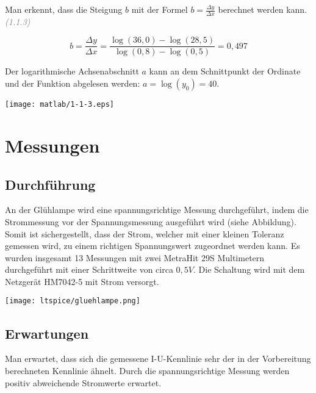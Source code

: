 Man erkennt, dass die Steigung $b$ mit der Formel $b = \frac{\varDelta y}{\varDelta x}  $ berechnet werden kann. \textcolor{gray}{\textit{(1.1.3)}}

\begin{equation*}
b = \frac{\varDelta y}{\varDelta x} = \frac{\log(36,0)-\log(28,5)}{\log(0,8)-\log(0,5)} = 0,497
\end{equation*}

Der logarithmische Achsenabschnitt $a$ kann an dem Schnittpunkt der Ordinate und der Funktion abgelesen werden:  $a = \log(y_0) = 40$.



\begin{center}
	\texttt{[image: matlab/1-1-3.eps]}
\end{center}
	
\section{Messungen}




	\subsection{Durchführung}
	
	An der Glühlampe wird eine spannungsrichtige Messung durchgeführt, indem die Strommessung vor der Spannungsmessung ausgeführt wird (siehe Abbildung). Somit ist sichergestellt, dass der Strom, welcher mit einer kleinen Toleranz gemessen wird, zu einem richtigen Spannungswert zugeordnet werden kann. Es wurden insgesamt 13 Messungen mit zwei MetraHit 29S Multimetern durchgeführt mit einer Schrittweite von circa $0,5V$. Die Schaltung wird mit dem Netzgerät HM7042-5 mit Strom versorgt.
	
	\newpage
	\thispagestyle{fancy}
	
	\begin{center}
		\texttt{[image: ltspice/gluehlampe.png]}
	\end{center}
	
	\subsection{Erwartungen}
	
	Man erwartet, dass sich die gemessene I-U-Kennlinie sehr der in der Vorbereitung berechneten Kennlinie ähnelt. Durch die spannungsrichtige Messung werden positiv abweichende Stromwerte erwartet. 

